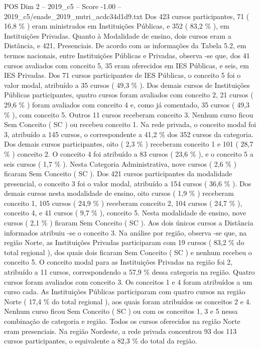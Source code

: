 \begin{textsample}{POS Dim 2 – 2019\_c5 – Score -1.00 – 2019\_c5/enade\_2019\_nutri\_acdc34d1d9.txt}
Dos 423 cursos participantes, 71 ( 16,8 \% ) eram ministrados em Instituições Públicas, e 352 ( 83,2 \% ), em Instituições Privadas.
Quanto à Modalidade de ensino, dois cursos eram a Distância, e 421, Presenciais.
De acordo com as informações da Tabela 5.2, em termos nacionais, entre Instituições Públicas e Privadas, observa -se que, dos 41 cursos avaliados com conceito 5, 35 eram oferecidos em IES Públicas, e seis, em IES Privadas.
Dos 71 cursos participantes de IES Públicas, o conceito 5 foi o valor modal, atribuído a 35 cursos ( 49,3 \% ).
Dos demais cursos de Instituições Públicas participantes, quatro cursos foram avaliados com conceito 2, 21 cursos ( 29,6 \% ) foram avaliados com conceito 4 e, como já comentado, 35 cursos ( 49,3 \% ), com conceito 5.
Outros 11 cursos receberam conceito 3.
Nenhum curso ficou Sem Conceito ( SC ) ou recebeu conceito 1.
Na rede privada, o conceito modal foi 3, atribuído a 145 cursos, o correspondente a 41,2 \% dos 352 cursos da categoria.
Dos demais cursos participantes, oito ( 2,3 \% ) receberam conceito 1 e 101 ( 28,7 \% ) conceito 2.
O conceito 4 foi atribuído a 83 cursos ( 23,6 \% ), e o conceito 5 a seis cursos ( 1,7 \% ).
Nesta Categoria Administrativa, nove cursos ( 2,6 \% ) ficaram Sem Conceito ( SC ).
Dos 421 cursos participantes da modalidade presencial, o conceito 3 foi o valor modal, atribuído a 154 cursos ( 36,6 \% ).
Dos demais cursos nesta modalidade de ensino, oito cursos ( 1,9 \% ) receberam conceito 1, 105 cursos ( 24,9 \% ) receberam conceito 2, 104 cursos ( 24,7 \% ), conceito 4, e 41 cursos ( 9,7 \% ), conceito 5.
Nesta modalidade de ensino, nove cursos ( 2,1 \% ) ficaram Sem Conceito ( SC ).
Aos dois únicos cursos a Distância informados atribuiu -se o conceito 3.
Na análise por região, observa -se que, na região Norte, as Instituições Privadas participaram com 19 cursos ( 83,2 \% do total regional ), dos quais dois ficaram Sem Conceito ( SC ) e nenhum recebeu o conceito 5.
O conceito modal para as Instituições Privadas na região foi 2, atribuído a 11 cursos, correspondendo a 57,9 \% dessa categoria na região.
Quatro cursos foram avaliados com conceito 3.
Os conceitos 1 e 4 foram atribuídos a um curso cada.
As Instituições Públicas participaram com quatro cursos na região Norte ( 17,4 \% do total regional ), aos quais foram atribuídos os conceitos 2 e 4.
Nenhum curso ficou Sem Conceito ( SC ) ou com os conceitos 1, 3 e 5 nessa combinação de categoria e região.
Todos os cursos oferecidos na região Norte eram presenciais.
Na região Nordeste, a rede privada concentrou 93 dos 113 cursos participantes, o equivalente a 82,3 \% do total da região.

\end{textsample}
